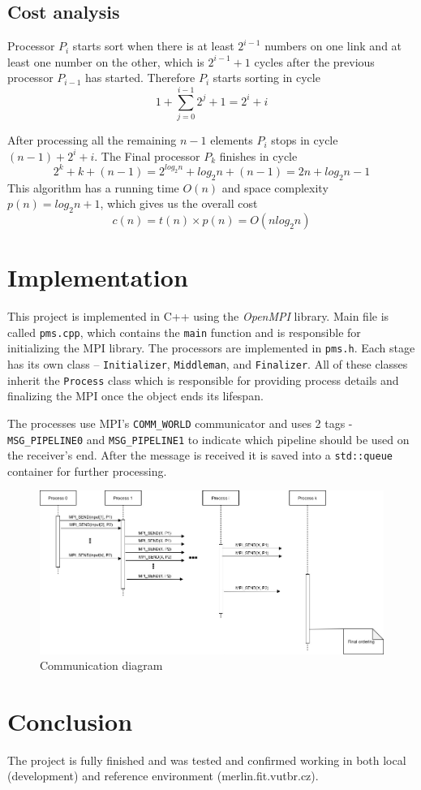 \documentclass[11pt,a4paper,oneside]{article}
\begin{document}
	\subsection{Cost analysis}
		Processor $P_i$ starts sort when there is at least $2^{i-1}$ numbers on one link and at least one number on the other, which is $2^{i-1} + 1$ cycles after the previous processor $P_{i-1}$ has started. Therefore $P_i$ starts sorting in cycle
		\[
			1+\sum_{j=0}^{i-1}2^j + 1 = 2^i + i
		\]
		
		After processing all the remaining $n-1$ elements $P_i$ stops in cycle $(n-1) + 2^i + i$. The Final processor $P_k$ finishes in cycle
		\[
			2^k + k + (n-1) = 2^{log_2 n} + log_2 n + (n-1) = 2n + log_2 n - 1
		\]
		This algorithm has a running time $O(n)$ and space complexity $p(n) = log_2 n +1$, which gives us the overall cost
		\[
			c(n) = t(n) \times p(n) = O(n log_2 n)
		\]
	

\section{Implementation}
	This project is implemented in C++ using the \textit{OpenMPI} library. Main file is called \texttt{pms.cpp}, which contains the \texttt{main} function and is responsible for initializing the MPI library. The processors are implemented in \texttt{pms.h}. Each stage has its own class -- \texttt{Initializer}, \texttt{Middleman}, and \texttt{Finalizer}. All of these classes inherit the \texttt{Process} class which is responsible for providing process details and finalizing the MPI once the object ends its lifespan.
	
	The processes use MPI's \texttt{COMM\_WORLD} communicator and uses 2 tags - \texttt{MSG\_PIPELINE0} and \texttt{MSG\_PIPELINE1} to indicate which pipeline should be used on the receiver's end. After the message is received it is saved into a \texttt{std::queue} container for further processing.
	
	\begin{figure}[h]
		\centering
		\includegraphics[width=1\linewidth]{img/diagram}
		\caption{Communication diagram}
		\label{fig:diagram}
	\end{figure}
	

\section{Conclusion}
	The project is fully finished and was tested and confirmed working in both local (development) and reference environment (merlin.fit.vutbr.cz).
	


\end{document}
